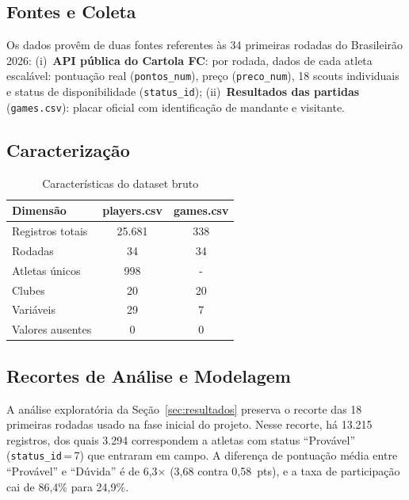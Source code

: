 \documentclass[12pt, a4paper, oneside]{article}
\begin{document}
\subsection{Fontes e Coleta}

Os dados provêm de duas fontes referentes às 34 primeiras rodadas do Brasileirão 2026:
(i)~\textbf{API pública do Cartola FC}: por rodada, dados de cada atleta escalável:
pontuação real (\texttt{pontos\_num}), preço (\texttt{preco\_num}), 18 scouts individuais
e status de disponibilidade (\texttt{status\_id}); (ii)~\textbf{Resultados das partidas}
(\texttt{games.csv}): placar oficial com identificação de mandante e visitante.

\subsection{Caracterização}

\begin{table}[H]
\centering
\caption{Características do dataset bruto}
\label{tab:dataset}
\begin{tabular}{lcc}
\toprule
\textbf{Dimensão} & \textbf{players.csv} & \textbf{games.csv}\\
\midrule
Registros totais  & 25.681 & 338 \\
Rodadas           & 34     & 34  \\
Atletas únicos    & 998    & {-} \\
Clubes            & 20     & 20  \\
Variáveis         & 29     &  7  \\
Valores ausentes  & 0      &  0  \\
\bottomrule
\end{tabular}
\end{table}

\subsection{Recortes de Análise e Modelagem}
\label{subsec:amostra}

A análise exploratória da Seção~\ref{sec:resultados} preserva o recorte das 18
primeiras rodadas usado na fase inicial do projeto. Nesse recorte, há 13.215 registros,
dos quais 3.294 correspondem a atletas com status ``Provável''
(\texttt{status\_id}\,=\,7) que entraram em campo. A diferença de pontuação média
entre ``Provável'' e ``Dúvida'' é de 6,3$\times$ (3,68 contra 0,58~pts), e a taxa
de participação cai de 86,4\% para 24,9\%.
\end{document}
